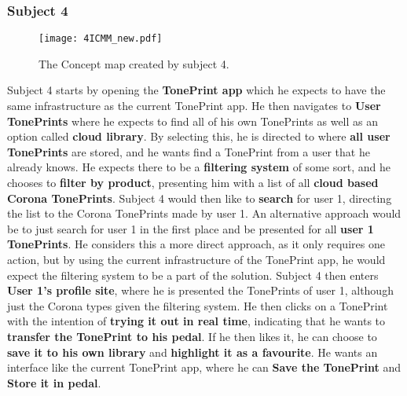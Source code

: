 \subsubsection{Subject 4}
\label{Subject4}
%
\begin{figure}[H]
	\centering
	\texttt{[image: 4ICMM\_new.pdf]}
	\caption{The Concept map created by subject 4.}
	\label{fig:ICMM4}
\end{figure}
%
Subject 4 starts by opening the \textbf{TonePrint app} which he expects to have the same infrastructure as the current TonePrint app. He then navigates to \textbf{User TonePrints} where he expects to find all of his own TonePrints as well as an option called \textbf{cloud library}. By selecting this, he is directed to where \textbf{all user TonePrints} are stored, and he wants find a TonePrint from a user that he already knows. He expects there to be a \textbf{filtering system} of some sort, and he chooses to \textbf{filter by product}, presenting him with a list of all \textbf{cloud based Corona TonePrints}. Subject 4 would then like to \textbf{search} for user 1, directing the list to the Corona TonePrints made by user 1. An alternative approach would be to just search for user 1 in the first place and be presented for all \textbf{user 1 TonePrints}. He considers this a more direct approach, as it only requires one action, but by using the current infrastructure of the TonePrint app, he would expect the filtering system to be a part of the solution. Subject 4 then enters \textbf{User 1’s profile site}, where he is presented the TonePrints of user 1, although just the Corona types given the filtering system. He then clicks on a TonePrint with the intention of \textbf{trying it out in real time}, indicating that he wants to \textbf{transfer the TonePrint to his pedal}. If he then likes it, he can choose to \textbf{save it to his own library} and \textbf{highlight it as a favourite}. He wants an interface like the current TonePrint app, where he can \textbf{Save the TonePrint} and \textbf{Store it in pedal}.
%
